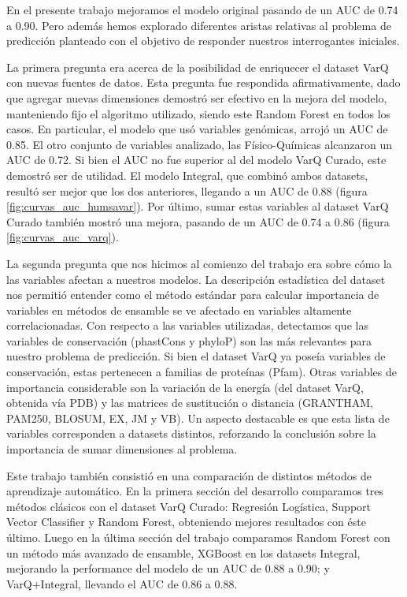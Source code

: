 En el presente trabajo mejoramos el modelo original pasando de un AUC de 0.74 a 0.90. Pero además hemos explorado diferentes aristas relativas al problema de predicción planteado con el objetivo de responder nuestros interrogantes iniciales. 

La primera pregunta era acerca de la posibilidad de enriquecer el dataset VarQ con nuevas fuentes de datos. Esta pregunta fue respondida afirmativamente, dado que agregar nuevas dimensiones demostró ser efectivo en la mejora del modelo, manteniendo fijo el algoritmo utilizado, siendo este Random Forest en todos los casos. En particular, el modelo que usó variables genómicas, arrojó un AUC de 0.85. El otro conjunto de variables analizado, las Físico-Químicas alcanzaron un AUC de 0.72. Si bien el AUC no fue superior al del modelo VarQ Curado, este demostró ser de utilidad. El modelo Integral, que combinó ambos datasets, resultó ser mejor que los dos anteriores, llegando a un AUC de 0.88 (figura \ref{fig:curvas_auc_humsavar}). Por último, sumar estas variables al dataset VarQ Curado también mostró una mejora, pasando de un AUC de 0.74 a 0.86 (figura \ref{fig:curvas_auc_varq}). 

La segunda pregunta que nos hicimos al comienzo del trabajo era sobre cómo la las variables afectan a nuestros modelos. La descripción estadística del dataset nos permitió entender como el método estándar para calcular importancia de variables en métodos de ensamble se ve afectado en variables altamente correlacionadas. Con respecto a las variables utilizadas, detectamos que las variables de conservación (phastCons y phyloP) son las más relevantes para nuestro problema de predicción. Si bien el dataset VarQ ya poseía variables de conservación, estas pertenecen a familias de proteínas (Pfam). Otras variables de importancia considerable son la variación de la energía (del dataset VarQ, obtenida vía PDB) y las matrices de sustitución o distancia (GRANTHAM, PAM250, BLOSUM, EX, JM y VB). Un aspecto destacable es que esta lista de variables corresponden a datasets distintos, reforzando la conclusión sobre la importancia de sumar dimensiones al problema.

Este trabajo también consistió en una comparación de distintos métodos de aprendizaje automático. En la primera sección del desarrollo comparamos tres métodos clásicos con el dataset VarQ Curado: Regresión Logística, Support Vector Classifier y Random Forest, obteniendo mejores resultados con éste último. Luego en la última sección del trabajo comparamos Random Forest con un método más avanzado de ensamble, XGBoost en los datasets Integral, mejorando la performance del modelo de un AUC de 0.88 a 0.90; y VarQ+Integral, llevando el AUC de 0.86 a 0.88.

